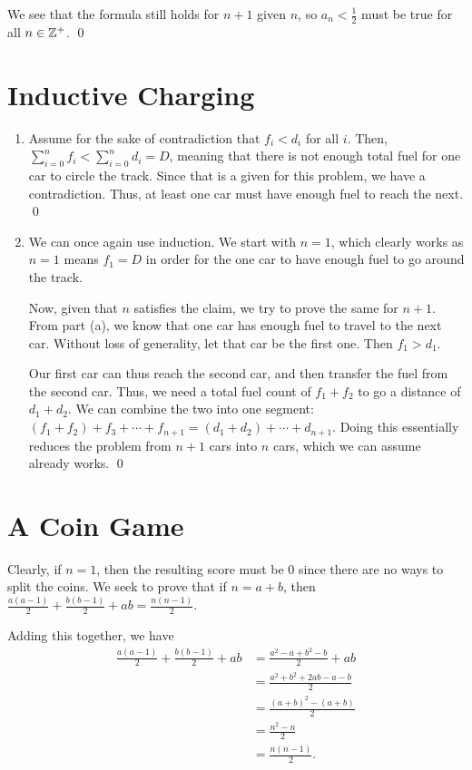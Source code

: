 \documentclass{article}
\begin{document}
We see that the formula still holds for $n+1$ given $n$, so $a_n < \frac{1}{2}$ must be 
true for all $n \in \mathbb Z^+$. \qed

\section{Inductive Charging}
\begin{enumerate}[label=\alph*.]
	\item Assume for the sake of contradiction that $f_i < d_i$ for all $i$. 
		Then, $\sum_{i=0}^{n} f_i < \sum_{i=0}^n d_i = D$, meaning that 
		there is not enough total fuel for one car to circle the track. 
		Since that is a given for this problem, we have a contradiction. 
		Thus, at least one car must have enough fuel to reach the next. \qed
	\item We can once again use induction. We start with $n=1$, which clearly works 
		as $n=1$ means $f_1 = D$ in order for the one car to have enough fuel to go 
		around the track. 

		Now, given that $n$ satisfies the claim, we try to prove the same for $n+1$. 
		From part (a), we know that one car has enough fuel to travel to the next car. 
		Without loss of generality, let that car be the first one. Then $f_1 > d_1$. 

		Our first car can thus reach the second car, and then transfer the fuel from the second 
		car. Thus, we need a total fuel count of $f_1 + f_2$ to go a distance of 
		$d_1 + d_2$. We can combine the two into one segment: $(f_1+f_2) + f_3 + \cdots + f_{n+1} = (d_1+d_2) 
		+ \cdots + d_{n+1}$. Doing this essentially reduces the problem from $n+1$ cars into $n$ cars,
		which we can assume already works. \qed 
\end{enumerate}

\section{A Coin Game}
Clearly, if $n = 1$, then the resulting score must be 0 since there are no ways 
to split the coins. We seek to prove that if $n = a+b$, then $\frac{a(a-1)}{2} + \frac{b(b-1)}{2} + ab =
\frac{n(n-1)}{2}$. 

Adding this together, we have
\begin{align*}
	\frac{a(a-1)}{2} + \frac{b(b-1)}{2} + ab &= \frac{a^2-a + b^2-b}{2} + ab \\
	&= \frac{a^2 + b^2 + 2ab - a - b}{2} \\
	&= \frac{(a+b)^2 - (a+b)}{2} \\
	&= \frac{n^2 - n}{2} \\
	&= \frac{n(n-1)}{2}.
\end{align*}
\end{document}
